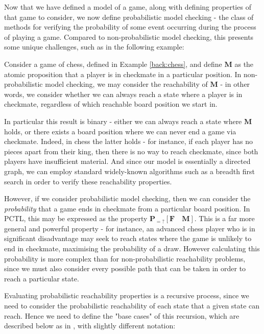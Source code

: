 Now that we have defined a model of a game, along with defining properties of that game to consider, we now define probabilistic model checking - the class of methods for verifying the probability of some event occurring during the process of playing a game. Compared to non-probabilistic model checking, this presents some unique challenges, such as in the following example:

\begin{example}
\label{back:chess-reachability}
    Consider a game of chess, defined in Example \ref{back:chess}, and define $\mathbf{M}$ as the atomic proposition that a player is in checkmate in a particular position. In non-probabilistic model checking, we may consider the reachability of $\mathbf{M}$ - in other words, we consider whether we can always reach a state where a player is in checkmate, regardless of which reachable board position we start in.
    
    In particular this result is binary - either we can always reach a state where $\mathbf{M}$ holds, or there exists a board position where we can never end a game via checkmate. Indeed, in chess the latter holds - for instance, if each player has no pieces apart from their king, then there is no way to reach checkmate, since both players have insufficient material. And since our model is essentially a directed graph, we can employ standard widely-known algorithms such as a breadth first search in order to verify these reachability properties.

    However, if we consider probabilistic model checking, then we can consider the \emph{probability} that a game ends in checkmate from a particular board position. In PCTL, this may be expressed as the property $\mathbf{P}_{=?} [\mathbf{F} \quad \mathbf{M}]$. This is a far more general and powerful property - for instance, an advanced chess player who is in significant disadvantage may seek to reach states where the game is unlikely to end in checkmate, maximising the probability of a draw. However calculating this probability is more complex than for non-probabilistic reachability problems, since we must also consider every possible path that can be taken in order to reach a particular state.

\end{example}

Evaluating probabilistic reachability properties is a recursive process, since we need to consider the probabilistic reachability of each state that a given state can reach. Hence we need to define the "base cases" of this recursion, which are described below as in \cite{kwiatkowska_stochastic_2007}, with slightly different notation:

